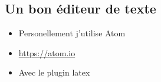 \documentclass[./beamerCoursIsenLaTeX.tex]{subfiles}
\begin{document}
\subsection{Un bon éditeur de texte}
\begin{frame}
 \begin{itemize}
  \item Personellement j'utilise Atom
  \item \url{https://atom.io}
  \item Avec le plugin latex
 \end{itemize}
 \cestimportant
\end{frame}
\end{document}
